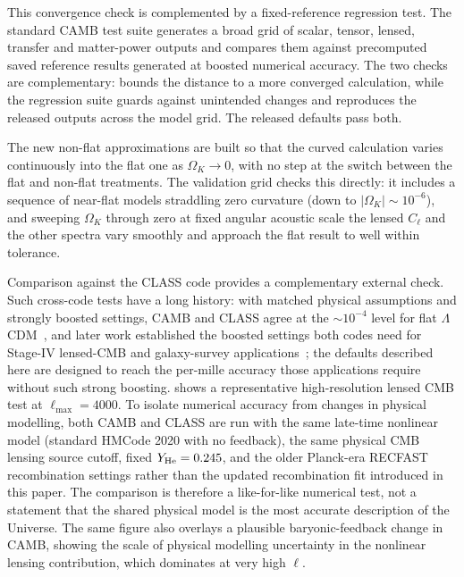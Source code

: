 \documentclass[prd, twocolumn, superscriptaddress, tightenlines, longbibliography, nofootinbib, eqsecnum, amsfonts, amsmath, floatfix, notitlepage]{revtex4-2}
\newcommand{\code}[1]{\texttt{\detokenize{#1}}}
\begin{document}
This convergence check is complemented by a fixed-reference regression test. The
standard \textsc{CAMB} test suite generates a broad grid of scalar, tensor, lensed,
transfer and matter-power outputs and compares them against precomputed saved
reference results generated at boosted numerical accuracy. The two checks are
complementary: \code{check_accuracy} bounds the distance to a more converged
calculation, while the regression suite guards against unintended changes and
reproduces the released outputs across the model grid. The released defaults
pass both.

The new non-flat approximations are built so that the curved calculation varies
continuously into the flat one as $\Omega_K\to0$, with no step at the switch
between the flat and non-flat treatments. The validation grid checks this
directly: it includes a sequence of near-flat models straddling zero curvature
(down to $|\Omega_K|\sim10^{-6}$), and sweeping $\Omega_K$ through zero at fixed
angular acoustic scale the lensed $C_\ell$ and the other spectra vary smoothly
and approach the flat result to well within tolerance.


Comparison against the \textsc{CLASS} code provides a
complementary external check. Such cross-code tests have a long history: with
matched physical assumptions and strongly boosted settings, \textsc{CAMB} and
\textsc{CLASS} agree at the $\sim10^{-4}$ level for flat
$\Lambda$CDM~\cite{Lesgourgues:2011rg}, and later work established the boosted
settings both codes need for Stage-IV lensed-CMB and galaxy-survey
applications~\cite{McCarthy:2021lfp,Euclid:2023pxu,Bolliet:2023sst}; the
defaults described here are designed to reach the per-mille accuracy those
applications require without such strong boosting.
 shows a representative high-resolution lensed
CMB test at \(\ell_{\max}=4000\). To isolate numerical accuracy from changes in
physical modelling, both \textsc{CAMB} and \textsc{CLASS} are run with the same
late-time nonlinear model (standard HMCode 2020 with no feedback), the same
physical CMB lensing source cutoff, fixed \(Y_{\rm He}=0.245\), and the
older Planck-era RECFAST recombination settings rather than the updated
recombination fit introduced in this paper. The comparison is therefore a
like-for-like numerical test, not a statement that the shared physical model is
the most accurate description of the Universe. The same figure also overlays a
plausible baryonic-feedback change in
\textsc{CAMB}, showing the scale of physical modelling uncertainty in the
nonlinear lensing contribution, which dominates at very high $\ell$.
\end{document}
